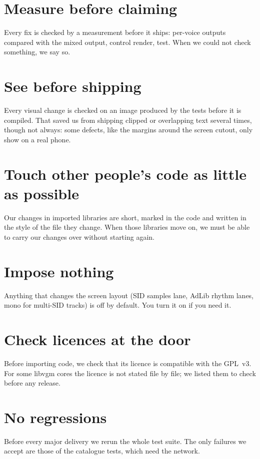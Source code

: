 \section{Measure before claiming}
Every fix is checked by a measurement before it ships: per-voice outputs compared with the mixed output, control
render, test. When we could not check something, we say so.

\section{See before shipping}
Every visual change is checked on an image produced by the tests before it is compiled. That saved us from shipping
clipped or overlapping text several times, though not always: some defects, like the margins around the screen
cutout, only show on a real phone.

\section{Touch other people's code as little as possible}
Our changes in imported libraries are short, marked in the code and written in the style of the file they change.
When those libraries move on, we must be able to carry our changes over without starting again.

\section{Impose nothing}
Anything that changes the screen layout (SID samples lane, AdLib rhythm lanes, mono for multi-SID tracks) is off by
default. You turn it on if you need it.

\section{Check licences at the door}
Before importing code, we check that its licence is compatible with the GPL~v3. For some libvgm cores the licence is
not stated file by file; we listed them to check before any release.

\section{No regressions}
Before every major delivery we rerun the whole test suite. The only failures we accept are those of the catalogue
tests, which need the network.
